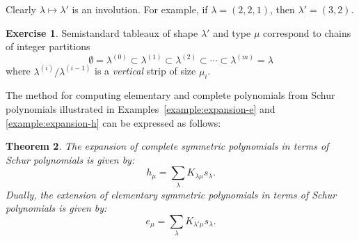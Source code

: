 \documentclass[11pt]{amsproc}
\newtheorem{theorem}{Theorem}[subsection]
\theoremstyle{definition}
\theoremstyle{example}
\newtheorem{exercise}[theorem]{Exercise}
\begin{document}
Clearly $\lambda\mapsto\lambda'$ is an involution.
For example, if $\lambda=(2,2,1)$, then $\lambda'=(3,2)$.
\begin{exercise}
Semistandard tableaux of shape $\lambda'$ and type $\mu$ correspond to chains of integer partitions
  \begin{displaymath}
    \emptyset = \lambda^{(0)} \subset \lambda^{(1)}\subset \lambda^{(2)} \subset \dotsb \subset \lambda^{(m)} = \lambda
  \end{displaymath}
  where $\lambda^{(i)}/\lambda^{(i-1)}$ is a \emph{vertical} strip of size $\mu_i$.  
\end{exercise}
The method for computing elementary and complete polynomials from Schur polynomials illustrated in Examples~\ref{example:expansion-e} and \ref{example:expansion-h} can be expressed as follows:
\begin{theorem}
  \label{theorem:schur-to-eh}
  The expansion of complete symmetric polynomials in terms of Schur polynomials is given by:
  \begin{displaymath}
    h_\mu = \sum_\lambda K_{\lambda\mu}s_\lambda.
  \end{displaymath}
  Dually, the extension of elementary symmetric polynomials in terms of Schur polynomials is given by:
  \begin{displaymath}
    e_\mu = \sum_\lambda K_{\lambda'\mu}s_\lambda.
  \end{displaymath}
\end{theorem}
\end{document}
